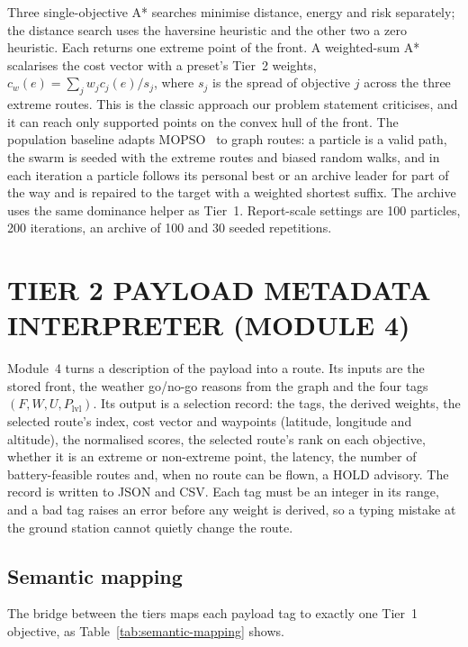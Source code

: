 Three single-objective A* searches minimise distance, energy and risk separately; the
distance search uses the haversine heuristic and the other two a zero heuristic. Each
returns one extreme point of the front. A weighted-sum A* scalarises the cost vector
with a preset's Tier~2 weights, $c_w(e) = \sum_j w_j c_j(e)/s_j$, where $s_j$ is the
spread of objective $j$ across the three extreme routes. This is the classic approach
our problem statement criticises, and it can reach only supported points on the convex
hull of the front. The population baseline adapts MOPSO~\cite{r6} to graph routes: a
particle is a valid path, the swarm is seeded with the extreme routes and biased random
walks, and in each iteration a particle follows its personal best or an archive leader
for part of the way and is repaired to the target with a weighted shortest suffix. The
archive uses the same dominance helper as Tier~1. Report-scale settings are 100
particles, 200 iterations, an archive of 100 and 30 seeded repetitions.

\section{TIER 2 PAYLOAD METADATA INTERPRETER (MODULE 4)}\label{sec:m4}

Module~4 turns a description of the payload into a route. Its inputs are the stored
front, the weather go/no-go reasons from the graph and the four tags
$(F, W, U, P_\mathrm{lvl})$. Its output is a selection record: the tags, the derived
weights, the selected route's index, cost vector and waypoints (latitude, longitude and
altitude), the normalised scores, the selected route's rank on each objective, whether
it is an extreme or non-extreme point, the latency, the number of battery-feasible
routes and, when no route can be flown, a HOLD advisory. The record is written to JSON
and CSV. Each tag must be an integer in its range, and a bad tag raises an error before
any weight is derived, so a typing mistake at the ground station cannot quietly change
the route.

\subsection{Semantic mapping}

The bridge between the tiers maps each payload tag to exactly one Tier~1 objective, as
Table~\ref{tab:semantic-mapping} shows.

